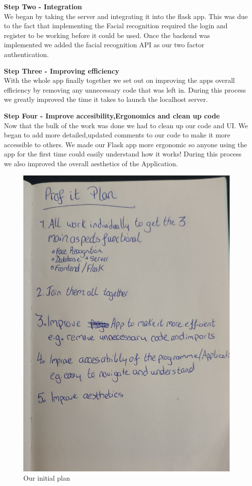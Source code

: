 \documentclass{article}
\begin{document}
\textbf{Step Two - Integration} \\
We began by taking the server and integrating it into the flask app. This was due to the fact that implementing the Facial recognition required the login and register to be working before it could be used.
Once the backend was implemented we added the facial recognition API as our two factor authentication.\medskip

\textbf{Step Three - Improving efficiency} \\
With the whole app finally together we set out on improving the apps overall efficiency by  removing any unnecessary code that was left in. During this process we greatly improved the time it takes to launch the localhost server.\medskip

\textbf{Step Four - Improve accesibility,Ergonomics and clean up code} \\
Now that the bulk of the work was done we had to clean up our code and UI. We began to add more detailed,updated comments to our code to make it more accessible to others. We made our Flask app more ergonomic so anyone using the app for the first time could easily understand how it works! During this process we also improved the overall aesthetics of the Application.

\begin{figure}[h!]
\centering
\includegraphics[scale=0.25]{images/Plan.jpg}
\caption{Our initial plan }
\end{figure}
\end{document}
